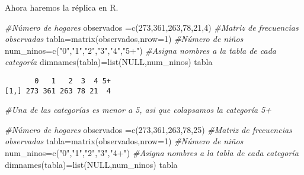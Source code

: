 \documentclass[
  a4paper,
  oneside,
  openany]{book}
\newenvironment{Shaded}{\begin{snugshade}}{\end{snugshade}}
\newcommand{\AttributeTok}[1]{\textcolor[rgb]{0.77,0.63,0.00}{#1}}
\newcommand{\CommentTok}[1]{\textcolor[rgb]{0.56,0.35,0.01}{\textit{#1}}}
\newcommand{\ConstantTok}[1]{\textcolor[rgb]{0.00,0.00,0.00}{#1}}
\newcommand{\DecValTok}[1]{\textcolor[rgb]{0.00,0.00,0.81}{#1}}
\newcommand{\FunctionTok}[1]{\textcolor[rgb]{0.00,0.00,0.00}{#1}}
\newcommand{\NormalTok}[1]{#1}
\newcommand{\OtherTok}[1]{\textcolor[rgb]{0.56,0.35,0.01}{#1}}
\newcommand{\StringTok}[1]{\textcolor[rgb]{0.31,0.60,0.02}{#1}}
\begin{document}
Ahora haremos la réplica en R.

\begin{Shaded}
\begin{Highlighting}[]
\CommentTok{\#Número de hogares}
\NormalTok{observados }\OtherTok{=}\FunctionTok{c}\NormalTok{(}\DecValTok{273}\NormalTok{,}\DecValTok{361}\NormalTok{,}\DecValTok{263}\NormalTok{,}\DecValTok{78}\NormalTok{,}\DecValTok{21}\NormalTok{,}\DecValTok{4}\NormalTok{) }
\CommentTok{\#Matriz de frecuencias observadas}
\NormalTok{tabla}\OtherTok{=}\FunctionTok{matrix}\NormalTok{(observados,}\AttributeTok{nrow=}\DecValTok{1}\NormalTok{)}
\CommentTok{\#Número de niños}
\NormalTok{num\_ninos}\OtherTok{=}\FunctionTok{c}\NormalTok{(}\StringTok{"0"}\NormalTok{,}\StringTok{"1"}\NormalTok{,}\StringTok{"2"}\NormalTok{,}\StringTok{"3"}\NormalTok{,}\StringTok{"4"}\NormalTok{,}\StringTok{"5+"}\NormalTok{)}
\CommentTok{\#Asigna nombres a la tabla de cada categoría}
\FunctionTok{dimnames}\NormalTok{(tabla)}\OtherTok{=}\FunctionTok{list}\NormalTok{(}\ConstantTok{NULL}\NormalTok{,num\_ninos)}
\NormalTok{tabla}
\end{Highlighting}
\end{Shaded}

\begin{verbatim}
       0   1   2  3  4 5+
[1,] 273 361 263 78 21  4
\end{verbatim}

\begin{Shaded}
\begin{Highlighting}[]
\CommentTok{\#Una de las categorías es menor a 5, asi que colapsamos la categoría 5+}

\CommentTok{\#Número de hogares}
\NormalTok{observados }\OtherTok{=}\FunctionTok{c}\NormalTok{(}\DecValTok{273}\NormalTok{,}\DecValTok{361}\NormalTok{,}\DecValTok{263}\NormalTok{,}\DecValTok{78}\NormalTok{,}\DecValTok{25}\NormalTok{)}
\CommentTok{\#Matriz de frecuencias observadas}
\NormalTok{tabla}\OtherTok{=}\FunctionTok{matrix}\NormalTok{(observados,}\AttributeTok{nrow=}\DecValTok{1}\NormalTok{)}
\CommentTok{\#Número de niños}
\NormalTok{num\_ninos}\OtherTok{=}\FunctionTok{c}\NormalTok{(}\StringTok{"0"}\NormalTok{,}\StringTok{"1"}\NormalTok{,}\StringTok{"2"}\NormalTok{,}\StringTok{"3"}\NormalTok{,}\StringTok{"4+"}\NormalTok{)}
\CommentTok{\#Asigna nombres a la tabla de cada categoría}
\FunctionTok{dimnames}\NormalTok{(tabla)}\OtherTok{=}\FunctionTok{list}\NormalTok{(}\ConstantTok{NULL}\NormalTok{,num\_ninos)}
\NormalTok{tabla}
\end{Highlighting}
\end{Shaded}
\end{document}
